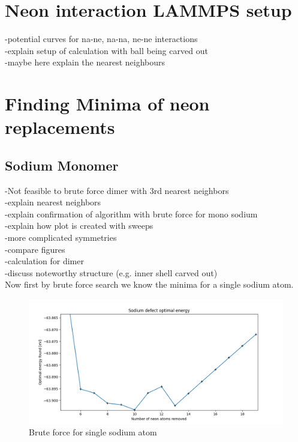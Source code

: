 \chapter{Neon interaction LAMMPS setup}
-potential curves for na-ne, na-na, ne-ne interactions\\
-explain setup of calculation with ball being carved out\\
-maybe here explain the nearest neighbours
\chapter{Finding Minima of neon replacements}
\label{chap:Erstes Kapitel}
\section{Sodium Monomer}
-Not feasible to brute force dimer with 3rd nearest neighbors\\
-explain nearest neighbors\\
-explain confirmation of algorithm with brute force for mono sodium\\
-explain how plot is created with sweeps\\
-more complicated symmetries\\
-compare figures\\
-calculation for dimer\\
-discuss noteworthy structure (e.g. inner shell carved out)\\
Now first by brute force search we know the minima for a single sodium atom.

\begin{figure}[h!]
	\centering
	\includegraphics[scale=0.5]{./Inhalt/Bilder/optimal_defect_brute_force.png}
	\caption{Brute force for single sodium atom}
	\label{fig:bruteforcesodium}
\end{figure}

